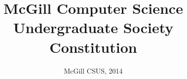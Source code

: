 

\title{McGill Computer Science Undergraduate Society Constitution}%
\author{
\normalsize \normalfont \sffamily 
McGill CSUS, 2014
}
\date{}



\maketitle

\begin{multicols}{2}
	
\end{multicols}

